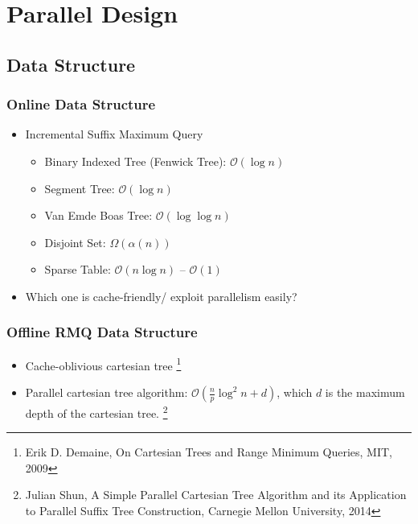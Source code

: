 \section{Parallel Design}

\subsection{Data Structure}
\begin{frame}
    \frametitle{Online Data Structure}
    \begin{itemize}
    \setlength\itemsep{1em}
    	\item Incremental Suffix Maximum Query
    		\begin{itemize}
    			\setlength\itemsep{1em}
    			\item Binary Indexed Tree (Fenwick Tree): $\mathcal{O}(\log n)$
    			\item Segment Tree: $\mathcal{O}(\log n)$
    			\item Van Emde Boas Tree: $\mathcal{O}(\log \log n)$
    			\item Disjoint Set: $\Omega(\alpha(n))$
    			\item Sparse Table: $\mathcal{O}(n \log n)$ -- $\mathcal{O}(1)$
    		\end{itemize}
    	\item Which one is cache-friendly/ exploit parallelism easily?
    \end{itemize}
\end{frame}

\begin{frame}
    \frametitle{Offline RMQ Data Structure}
    \begin{itemize}
    \setlength\itemsep{1em}
    	\item Cache-oblivious cartesian tree
    	\footnote{Erik D. Demaine, On Cartesian Trees and Range Minimum Queries, MIT, 2009}
    	\item Parallel cartesian tree algorithm:  $\mathcal{O}(\frac{n}{p} \log^2 n + d)$, 
    		which $d$ is the maximum depth of the cartesian tree.
    	\footnote{Julian Shun, A Simple Parallel Cartesian Tree Algorithm and its Application 
    		to Parallel Suffix Tree Construction, Carnegie Mellon University, 2014}
    \end{itemize}
\end{frame}

